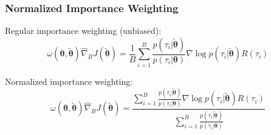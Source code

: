 \documentclass[aspectratio=169]{beamer}
\newcommand{\vtheta}{\boldsymbol{\theta}}
\begin{document}
\begin{frame} 
\frametitle{Normalized Importance Weighting} 

\begin{minipage}[]{.45\paperwidth}
Regular importance weighting (unbiased):
\begin{equation*}
	\omega(\vtheta,\widetilde{\vtheta})\widehat{\nabla}_B J(\widetilde{\vtheta}) = \frac{1}{B}\sum_{i=1}^B\frac{p(\tau_i\vert\widetilde{\vtheta})}{p(\tau_i\vert\vtheta)}\nabla\log p(\tau_i\vert\widetilde{\vtheta})R(\tau_i)
\end{equation*}
\vfill

Normalized importance weighting:
\begin{equation*}
\omega(\vtheta,\widetilde{\vtheta})\widehat{\nabla}_B J(\widetilde{\vtheta}) = \frac{\sum_{i=1}^B\frac{p(\tau_i\vert\widetilde{\vtheta})}{p(\tau_i\vert\vtheta)}\nabla\log p(\tau_i\vert\widetilde{\vtheta})R(\tau_i)}
	{\sum_{i=1}^B\frac{p(\tau_i\vert\widetilde{\vtheta})}{p(\tau_i\vert\vtheta)}}
\end{equation*}
\vfill


\end{minipage}
\end{frame}
\end{document}
